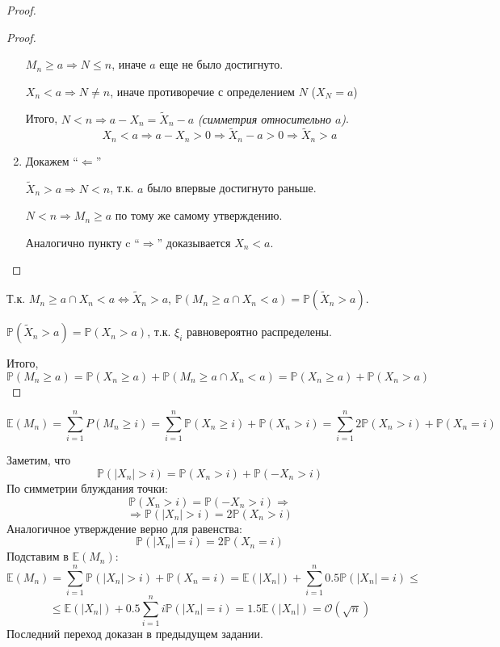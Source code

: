 \begin{proof}
\begin{proof}
\begin{enumerate}
            $M_n\geq a \Rightarrow N \leq n$, иначе $a$ еще не было достигнуто.
    
            $X_n < a \Rightarrow N\not=n$, иначе противоречие с определением $N$ ($X_N=a$)
    
            Итого, $N < n \Rightarrow a-X_n=\tilde X_n - a$ \textit{(симметрия относительно $a$)}.
            $$X_n<a \Rightarrow a-X_n>0 \Rightarrow \tilde X_n - a > 0 \Rightarrow \tilde X_n > a$$

            \item Докажем ``$\Leftarrow$''
            
            $\tilde X_n > a \Rightarrow N < n$, т.к. $a$ было впервые достигнуто раньше.

            $N < n \Rightarrow M_n\geq a$ по тому же самому утверждению.

            Аналогично пункту c ``$\Rightarrow$'' доказывается $X_n < a$.
        \end{enumerate}
    \end{proof}

    Т.к. $M_n \geq a \cap X_n < a \Leftrightarrow \tilde X_n > a$, $\mathbb P(M_n \geq a \cap X_n < a)=\mathbb P(\tilde X_n > a)$.

    $\mathbb P(\tilde X_n > a)=\mathbb P(X_n > a)$, т.к. $\xi_i$ равновероятно распределены.

    Итого, $\mathbb P(M_n \geq a) = \mathbb P(X_n \geq a) + \mathbb P(M_n \geq a \cap X_n < a)=\mathbb P(X_n \geq a) + \mathbb P(X_n > a)$
\end{proof}

$$\mathbb E(M_n)=\sum_{i=1}^n P(M_n \geq i)=\sum_{i=1}^n \mathbb P(X_n \geq i) + \mathbb P(X_n > i)=\sum_{i=1}^n 2\mathbb P(X_n > i) + \mathbb P(X_n = i)$$

Заметим, что
$$\mathbb P(|X_n| > i)=\mathbb P(X_n > i)+\mathbb P(-X_n > i)$$
По симметрии блуждания точки:
$$\mathbb P(X_n > i)=\mathbb P(-X_n > i) \Rightarrow$$
$$\Rightarrow \mathbb P(|X_n| > i)=2\mathbb P(X_n > i)$$
Аналогичное утверждение верно для равенства:
$$\mathbb P(|X_n| = i)=2\mathbb P(X_n = i)$$
Подставим в $\mathbb E(M_n)$:
$$\mathbb E(M_n)=\sum_{i=1}^n \mathbb P(|X_n| > i) + \mathbb P(X_n = i)=\mathbb E(|X_n|)+\sum_{i=1}^n 0.5\mathbb P(|X_n| = i)\leq$$
$$\leq \mathbb E(|X_n|) + 0.5\sum_{i=1}^n i\mathbb P(|X_n| = i)=1.5\mathbb E(|X_n|)=\mathcal O(\sqrt n)$$
Последний переход доказан в предыдущем задании.

